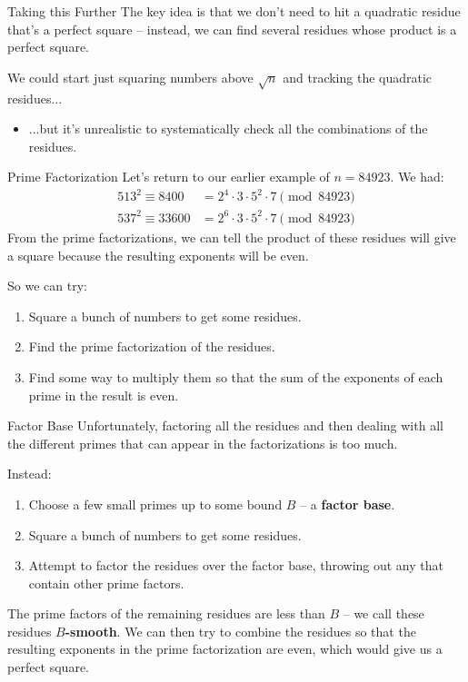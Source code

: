 \documentclass[aspectratio=169]{beamer}
\begin{document}
\begin{frame}{Taking this Further}
  The key idea is that we don't need to hit a quadratic residue that's a perfect square --
  instead, we can find several residues whose product is a perfect square.
  \pause

  We could start just squaring numbers above $\sqrt{n}$ and tracking the quadratic residues... \pause
  \begin{itemize}
    \item 
    ...but it's unrealistic to systematically check all the combinations of the residues.
  \end{itemize}
\end{frame}

\begin{frame}{Prime Factorization}
  Let's return to our earlier example of $n = 84923$. We had:
  \begin{align*}
    513^2 \equiv 8400 &= 2^4 \cdot 3 \cdot 5^2 \cdot 7 \pmod{84923} \\
    537^2 \equiv 33600 &= 2^6 \cdot 3 \cdot 5^2 \cdot 7 \pmod{84923}
  \end{align*} \pause
  From the prime factorizations, we can tell the product of these residues will give a
  square because the resulting exponents will be even. \pause

  So we can try:
  \begin{enumerate}
    \item Square a bunch of numbers to get some residues.
    \item Find the prime factorization of the residues. \pause
    \item Find some way to multiply them so that the sum of the exponents
    of each prime in the result is even.
  \end{enumerate}
\end{frame}

\begin{frame}{Factor Base}
  Unfortunately, factoring all the residues and then dealing
  with all the different primes that can appear in the factorizations is too much. \pause

  Instead:
  \begin{enumerate}
    \item Choose a few small primes up to some bound $B$ -- a \textbf{factor base}. \pause
    \item Square a bunch of numbers to get some residues.
    \item Attempt to factor the residues over the factor base,
    throwing out any that contain other prime factors.
  \end{enumerate} \pause
  The prime factors of the remaining residues are less than $B$ -- we call these residues \textbf{$B$-smooth}.
  We can then try to combine the residues so that the resulting exponents in the prime factorization are even,
  which would give us a perfect square.
\end{frame}
\end{document}
